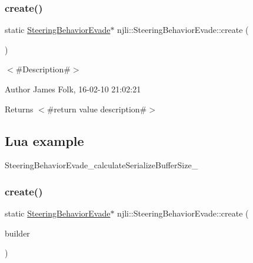 \subsubsection{\texorpdfstring{create()}{create()}\hspace{0.1cm}{\footnotesize\ttfamily [1/2]}}
{\footnotesize\ttfamily static \mbox{\hyperlink{classnjli_1_1_steering_behavior_evade}{Steering\+Behavior\+Evade}}$\ast$ njli\+::\+Steering\+Behavior\+Evade\+::create (\begin{DoxyParamCaption}{ }\end{DoxyParamCaption})\hspace{0.3cm}{\ttfamily [static]}}



$<$\#\+Description\#$>$ 

\begin{DoxyAuthor}{Author}
James Folk, 16-\/02-\/10 21\+:02\+:21
\end{DoxyAuthor}
\begin{DoxyReturn}{Returns}
$<$\#return value description\#$>$
\end{DoxyReturn}
\hypertarget{classnjli_1_1_steering_behavior_wander_ex1}{}\subsection{Lua example}\label{classnjli_1_1_steering_behavior_wander_ex1}

\begin{DoxyCodeInclude}
\end{DoxyCodeInclude}
Steering\+Behavior\+Evade\+\_\+calculate\+Serialize\+Buffer\+Size\+\_\+ \mbox{\label{classnjli_1_1_steering_behavior_evade_ab3fd0cd8031e94cea6fd3c24d8b8d036}} 
\subsubsection{\texorpdfstring{create()}{create()}\hspace{0.1cm}{\footnotesize\ttfamily [2/2]}}
{\footnotesize\ttfamily static \mbox{\hyperlink{classnjli_1_1_steering_behavior_evade}{Steering\+Behavior\+Evade}}$\ast$ njli\+::\+Steering\+Behavior\+Evade\+::create (\begin{DoxyParamCaption}\item[{const \mbox{\hyperlink{classnjli_1_1_steering_behavior_evade_builder}{Steering\+Behavior\+Evade\+Builder}} \&}]{builder }\end{DoxyParamCaption})\hspace{0.3cm}{\ttfamily [static]}}



